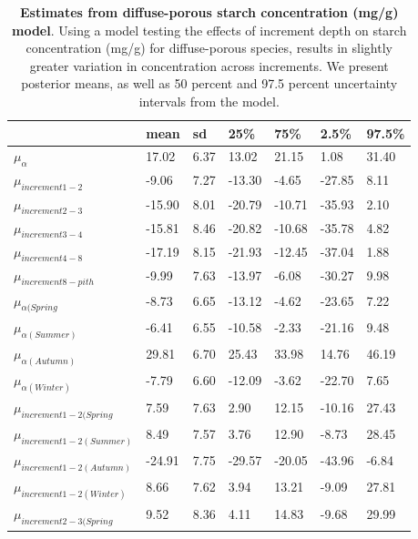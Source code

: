 \documentclass{article}\usepackage[]{graphicx}\usepackage[]{color}
\begin{document}
\begin{table}[ht]
\centering
\caption{\textbf{Estimates from diffuse-porous starch concentration (mg/g) model}. Using a model testing the effects of increment depth on starch concentration (mg/g) for diffuse-porous species, results in slightly greater variation in concentration across increments. We present posterior means, as well as 50 percent and 97.5 percent uncertainty intervals from the model.} 
\label{tab:diffstar}
\begingroup\footnotesize
\begin{tabular}{|p{}|p{}|p{}|p{}|p{}|p{}|p{}|}
  \hline
 & mean & sd & 25\% & 75\% & 2.5\% & 97.5\% \\ 
  \hline
$\mu_{\alpha}$ & 17.02 & 6.37 & 13.02 & 21.15 & 1.08 & 31.40 \\ 
  $\mu_{increment 1-2}$ & -9.06 & 7.27 & -13.30 & -4.65 & -27.85 & 8.11 \\ 
  $\mu_{increment 2-3}$ & -15.90 & 8.01 & -20.79 & -10.71 & -35.93 & 2.10 \\ 
  $\mu_{increment 3-4}$ & -15.81 & 8.46 & -20.82 & -10.68 & -35.78 & 4.82 \\ 
  $\mu_{increment 4-8}$ & -17.19 & 8.15 & -21.93 & -12.45 & -37.04 & 1.88 \\ 
  $\mu_{increment 8-pith}$ & -9.99 & 7.63 & -13.97 & -6.08 & -30.27 & 9.98 \\ 
  $\mu_{\alpha (Spring}$ & -8.73 & 6.65 & -13.12 & -4.62 & -23.65 & 7.22 \\ 
  $\mu_{\alpha (Summer)}$ & -6.41 & 6.55 & -10.58 & -2.33 & -21.16 & 9.48 \\ 
  $\mu_{\alpha (Autumn)}$ & 29.81 & 6.70 & 25.43 & 33.98 & 14.76 & 46.19 \\ 
  $\mu_{\alpha (Winter)}$ & -7.79 & 6.60 & -12.09 & -3.62 & -22.70 & 7.65 \\ 
  $\mu_{increment 1-2 (Spring}$ & 7.59 & 7.63 & 2.90 & 12.15 & -10.16 & 27.43 \\ 
  $\mu_{increment 1-2 (Summer)}$ & 8.49 & 7.57 & 3.76 & 12.90 & -8.73 & 28.45 \\ 
  $\mu_{increment 1-2 (Autumn)}$ & -24.91 & 7.75 & -29.57 & -20.05 & -43.96 & -6.84 \\ 
  $\mu_{increment 1-2 (Winter)}$ & 8.66 & 7.62 & 3.94 & 13.21 & -9.09 & 27.81 \\ 
  $\mu_{increment 2-3 (Spring}$ & 9.52 & 8.36 & 4.11 & 14.83 & -9.68 & 29.99 \\ 

\end{tabular}
\end{table}
\end{document}
